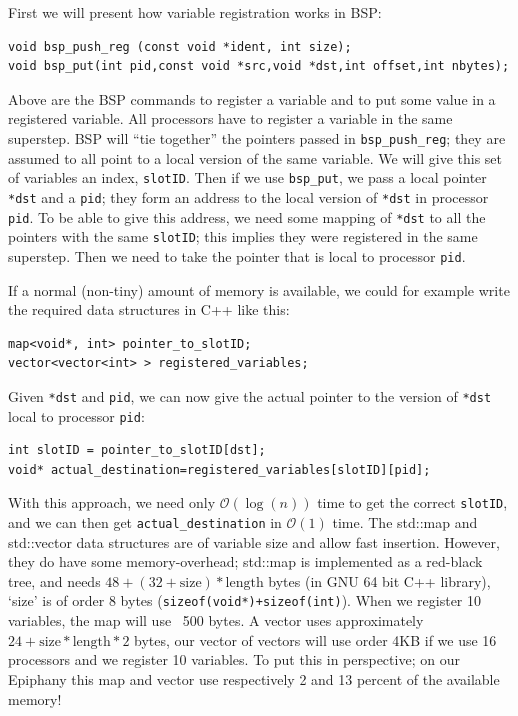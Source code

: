 \documentclass[fleqn]{article}
\renewcommand{\(}{\left(}
\renewcommand{\)}{\right)}
\begin{document}
First we will present how variable registration works in BSP:
\begin{lstlisting}
void bsp_push_reg (const void *ident, int size);
void bsp_put(int pid,const void *src,void *dst,int offset,int nbytes);
\end{lstlisting}
Above are the BSP commands to register a variable and to put some value in a registered variable.
All processors have to register a variable in the same superstep. BSP will ``tie together'' the pointers passed in \texttt{bsp\_push\_reg}; they are assumed to all point to a local version of the same variable. We will give this set of variables an index, \texttt{slotID}. Then if we use \texttt{bsp\_put}, we pass a local pointer \texttt{*dst} and a \texttt{\texttt{pid}}; they form an address to the local version of \texttt{*dst} in processor \texttt{pid}. To be able to give this address, we need some mapping of \texttt{*dst} to all the pointers with the same \texttt{slotID}; this implies they were registered in the same superstep. Then we need to take the pointer that is local to processor \texttt{pid}.

If a normal (non-tiny) amount of memory is available, we could for example write the required data structures in C++ like this:
\begin{lstlisting}
map<void*, int> pointer_to_slotID;
vector<vector<int> > registered_variables;
\end{lstlisting}
Given \texttt{*dst} and \texttt{pid}, we can now give the actual pointer to the version of \texttt{*dst} local to processor \texttt{pid}:
\begin{lstlisting}
int slotID = pointer_to_slotID[dst];
void* actual_destination=registered_variables[slotID][pid];
\end{lstlisting}
With this approach, we need only $\mathcal{O}(\log(n))$ time to get the correct \texttt{slotID}, and we can then get \texttt{actual\_destination} in $\mathcal{O}(1)$ time. The std::map and std::vector data structures are of variable size and allow fast insertion. However, they do have some memory-overhead; std::map is implemented as a red-black tree, and needs $48+(32+\text{size})*\text{length}$ bytes (in GNU 64 bit C++ library), `size' is of order 8 bytes (\texttt{sizeof(void*)+sizeof(int)}). When we register 10 variables, the map will use ~500 bytes. A vector uses approximately $24+\text{size}*\text{length}*2$ bytes, our vector of vectors will use order 4KB if we use 16 processors and we register 10 variables. To put this in perspective; on our Epiphany this map and vector use respectively 2 and 13 percent of the available memory!
\end{document}
